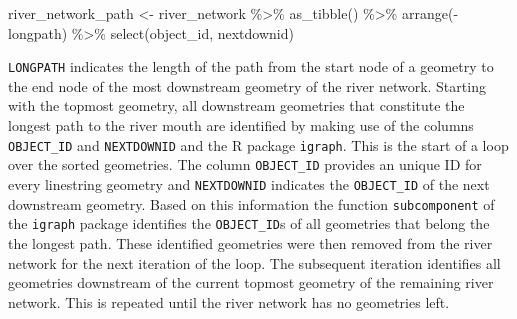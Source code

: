\documentclass[fleqn,10pt]{wlscirep}
\newenvironment{Shaded}{\begin{snugshade}}{\end{snugshade}}
\newcommand{\FunctionTok}[1]{\textcolor[rgb]{0.00,0.00,0.00}{#1}}
\newcommand{\NormalTok}[1]{#1}
\newcommand{\OtherTok}[1]{\textcolor[rgb]{0.56,0.35,0.01}{#1}}
\newcommand{\SpecialCharTok}[1]{\textcolor[rgb]{0.00,0.00,0.00}{#1}}
\begin{document}
\footnotesize

\begin{Shaded}
\begin{Highlighting}[]
\NormalTok{river\_network\_path }\OtherTok{\textless{}{-}} 
\NormalTok{  river\_network }\SpecialCharTok{\%\textgreater{}\%} 
  \FunctionTok{as\_tibble}\NormalTok{() }\SpecialCharTok{\%\textgreater{}\%} 
  \FunctionTok{arrange}\NormalTok{(}\SpecialCharTok{{-}}\NormalTok{longpath) }\SpecialCharTok{\%\textgreater{}\%} 
  \FunctionTok{select}\NormalTok{(object\_id, nextdownid)}
\end{Highlighting}
\end{Shaded}

\normalsize

\texttt{LONGPATH} indicates the length of the path from the start node of a geometry to the end node of the most downstream geometry of the river network. Starting with the topmost geometry, all downstream geometries that constitute the longest path to the river mouth are identified by making use of the columns \texttt{OBJECT\_ID} and \texttt{NEXTDOWNID} and the R package \texttt{igraph}. This is the start of a loop over the sorted geometries. The column \texttt{OBJECT\_ID} provides an unique ID for every linestring geometry and \texttt{NEXTDOWNID} indicates the \texttt{OBJECT\_ID} of the next downstream geometry. Based on this information the function \texttt{subcomponent} of the \texttt{igraph} package identifies the \texttt{OBJECT\_ID}s of all geometries that belong the the longest path. These identified geometries were then removed from the river network for the next iteration of the loop. The subsequent iteration identifies all geometries downstream of the current topmost geometry of the remaining river network. This is repeated until the river network has no geometries left.

\footnotesize
\end{document}
